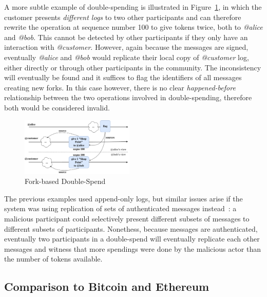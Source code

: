 \documentclass[sigplan,screen,10pt]{acmart}
\begin{document}
A more subtle example of double-spending is illustrated in Figure~\ref{figure:fork-double-spend}, in which the customer presents \textit{different logs} to two other participants and can therefore rewrite the operation at sequence number 100 to give tokens twice, both to \textit{@alice} and \textit{@bob}. This cannot be detected by other participants if they only have an interaction with \textit{@customer}. However, again because the messages are signed, eventually \textit{@alice} and \textit{@bob} would replicate their local copy of \textit{@customer} log, either directly or through other participants in the community. The inconsistency will eventually be found and it suffices to flag the identifiers of all messages creating new forks. In this case however, there is no clear \textit{happened-before} relationship between the two operations involved in double-spending, therefore both would be considered invalid.

\begin{figure}[htbp]
\centering
\includegraphics[width=0.48\textwidth]{figures/fork-double-spend-drawio}
\caption{Fork-based Double-Spend}
\label{figure:fork-double-spend}
\end{figure}

The previous examples used append-only logs, but similar issues arise if the system was using replication of sets of authenticated messages instead~\cite{meyer2021setreconciliation}: a malicious participant could selectively present different subsets of messages to different subsets of participants. Nonethess, because messages are authenticated, eventually two participants in a double-spend will eventually replicate each other messages and witness that more spendings were done by the malicious actor than the number of tokens available.

\subsection{Comparison to Bitcoin and Ethereum}
\end{document}
